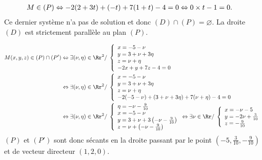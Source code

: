 {{\begin{align*}\ensuremath
M\in(P)&\Leftrightarrow-2(2+3t)+(-t)+7(1+t)-4=0
\Leftrightarrow
0\times t-1=0.
\end{align*}
Ce dernier système n'a pas de solution et donc $(D)\cap(P)=\varnothing$. La droite $(D)$ est strictement parallèle au plan $(P)$.

\begin{align*}\ensuremath
M(x,y,z)\in(P)\cap(P')&\Leftrightarrow\exists(\nu,\eta)\in\Rr^2/\;\left\{
\begin{array}{l}
x=-5-\nu\\
y=3+\nu+3\eta\\
z=\nu+\eta\\
-2x+y+7z-4=0
\end{array}
\right.\\
 &\Leftrightarrow\exists(\nu,\eta)\in\Rr^2/\;\left\{
\begin{array}{l}
x=-5-\nu\\
y=3+\nu+3\eta\\
z=\nu+\eta\\
-2(-5-\nu)+(3+\nu+3\eta)+7(\nu+\eta)-4=0
\end{array}
\right.\\
 &\Leftrightarrow\exists(\nu,\eta)\in\Rr^2/\;\left\{
\begin{array}{l}
\eta=-\nu-\frac{9}{10}\\
x=-5-\nu\\
y=3+\nu+3\left(-\nu-\frac{9}{10}\right)\\
z=\nu+\left(-\nu-\frac{9}{10}\right)
\end{array}
\right.
\Leftrightarrow
\exists\nu\in\Rr/\;
\left\{
\begin{array}{l}
x=-\nu-5\\
y=-2\nu+\frac{3}{10}\\
z=-\frac{9}{10}
\end{array}
\right.
\end{align*}
$(P)$ et $(P')$ sont donc sécants en la droite passant par le point $\left(-5,\frac{3}{10},-\frac{9}{10}\right)$ et de vecteur directeur $(1,2,0)$.
}
}
